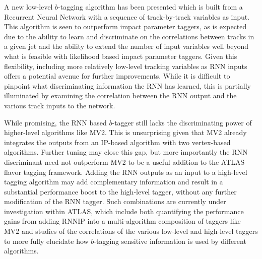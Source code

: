 A new low-level $b$-tagging algorithm has been presented which is built from a Recurrent Neural Network with a sequence of track-by-track variables as input.  This algorithm is seen to outperform impact parameter taggers, as is expected due to the ability to learn and discriminate on the correlations between tracks in a given jet and the ability to extend the number of input variables well beyond what is feasible with likelihood based impact parameter taggers. Given this flexibility, including more relatively low-level tracking variables as RNN inputs offers a potential avenue for further improvements. While it is difficult to pinpoint what discriminating information the RNN has learned,  this is partially illuminated by examining the correlation between the RNN output and the various track inputs to the network.

While promising, the RNN based $b$-tagger still lacks the discriminating power of higher-level algorithms like MV2. This is unsurprising given that MV2 already integrates the outputs from an IP-based algorithm with two vertex-based algorithms. Further tuning may close this gap, but more importantly the RNN discriminant need not outperform MV2 to be a useful addition to the ATLAS flavor tagging framework. Adding the RNN outputs as an input to a high-level tagging algorithm may add complementary information and result in a substantial performance boost to the high-level tagger, without any further modification of the RNN tagger. Such combinations are currently under investigation within ATLAS, which include both quantifying the performance gains from adding RNNIP  into a multi-algorithm composition of taggers like MV2 and studies of the correlations of the various low-level and high-level taggers to more fully elucidate how $b$-tagging sensitive information is used by different algorithms.
